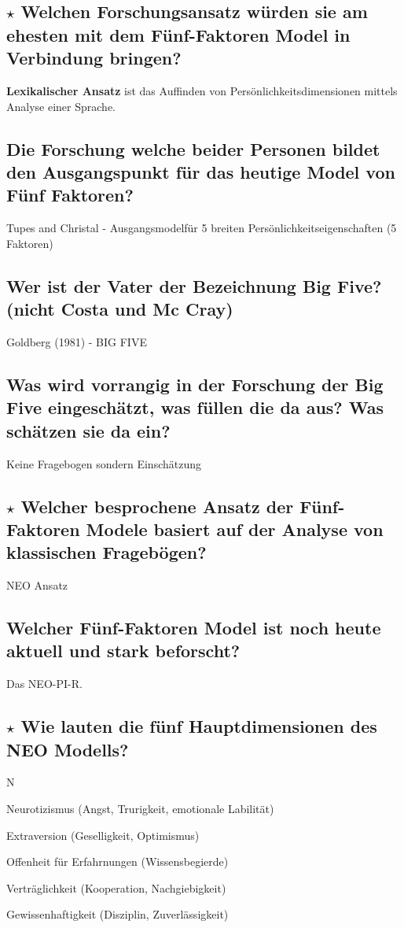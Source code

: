 \documentclass[a4paper,9pt,DIV=14]{scrartcl}
\begin{document}
\subsection{$\star$ Welchen Forschungsansatz würden sie am ehesten mit dem Fünf-Faktoren Model in Verbindung bringen?} %
    \textbf{Lexikalischer Ansatz} ist das Auffinden von Persönlichkeitsdimensionen mittels Analyse einer Sprache.
\subsection{Die Forschung welche beider Personen bildet den Ausgangspunkt für das heutige Model von Fünf Faktoren?}
    Tupes and Christal - Ausgangsmodelfür 5 breiten Persönlichkeitseigenschaften (5 Faktoren)
\subsection{Wer ist der Vater der Bezeichnung Big Five? (nicht Costa und Mc Cray)}
    Goldberg (1981) - BIG FIVE
\subsection{Was wird vorrangig in der Forschung der Big Five eingeschätzt, was füllen die da aus? Was schätzen sie da ein?}
    Keine Fragebogen sondern Einschätzung
\subsection{$\star$ Welcher besprochene Ansatz der Fünf-Faktoren Modele basiert auf der Analyse von klassischen Fragebögen?} %
    NEO Ansatz
\subsection{Welcher Fünf-Faktoren Model ist noch heute aktuell und stark beforscht?}
    Das NEO-PI-R.
\subsection{$\star$ Wie lauten die fünf Hauptdimensionen des NEO Modells?} %
    \begin{labeling}{N}
        \item [N] Neurotizismus (Angst, Trurigkeit, emotionale Labilität)
        \item [E] Extraversion (Geselligkeit, Optimismus)
        \item [O] Offenheit für Erfahrnungen (Wissensbegierde)
        \item [A] Verträglichkeit (Kooperation, Nachgiebigkeit)
        \item [C] Gewissenhaftigkeit (Disziplin, Zuverlässigkeit)
    \end{labeling}
\end{document}
